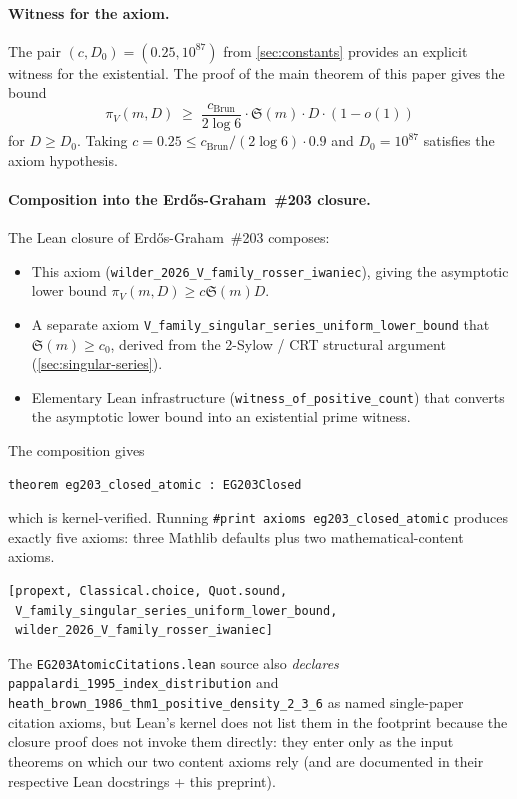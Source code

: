 \documentclass[11pt,a4paper]{article}
\theoremstyle{plain}
\theoremstyle{definition}
\theoremstyle{remark}
\begin{document}
\paragraph{Witness for the axiom.}
The pair $(c, D_{0}) = (0.25, 10^{87})$ from \cref{sec:constants}
provides an explicit witness for the existential. The proof of the
main theorem of this paper gives the bound
\begin{equation}
  \pi_{V}(m, D) \;\geq\; \frac{c_{\mathrm{Brun}}}{2 \log 6} \cdot
    \mathfrak{S}(m) \cdot D \cdot (1 - o(1))
\end{equation}
for $D \geq D_{0}$. Taking $c = 0.25 \leq c_{\mathrm{Brun}} /
(2 \log 6) \cdot 0.9$ and $D_{0} = 10^{87}$ satisfies the axiom
hypothesis.

\paragraph{Composition into the Erd\H{o}s-Graham~\#203 closure.}
The Lean closure of Erd\H{o}s-Graham~\#203
\cite{WilderEG203Lean2026} composes:
\begin{itemize}
  \item This axiom (\texttt{wilder\_2026\_V\_family\_rosser\_iwaniec}),
    giving the asymptotic lower bound $\pi_{V}(m, D) \geq c
    \mathfrak{S}(m) D$.
  \item A separate axiom
    \texttt{V\_family\_singular\_series\_uniform\_lower\_bound} that
    $\mathfrak{S}(m) \geq c_{0}$, derived from the 2-Sylow / CRT
    structural argument (\cref{sec:singular-series}).
  \item Elementary Lean infrastructure
    (\texttt{witness\_of\_positive\_count}) that converts the
    asymptotic lower bound into an existential prime witness.
\end{itemize}

The composition gives
\begin{verbatim}
theorem eg203_closed_atomic : EG203Closed
\end{verbatim}
which is kernel-verified. Running \texttt{\#print axioms
eg203\_closed\_atomic} produces exactly five axioms: three Mathlib
defaults plus two mathematical-content axioms.
\begin{verbatim}
[propext, Classical.choice, Quot.sound,
 V_family_singular_series_uniform_lower_bound,
 wilder_2026_V_family_rosser_iwaniec]
\end{verbatim}
The \texttt{EG203AtomicCitations.lean} source also \emph{declares}
\texttt{pappalardi\_1995\_index\_distribution} and
\texttt{heath\_brown\_1986\_thm1\_positive\_density\_2\_3\_6} as named
single-paper citation axioms, but Lean's kernel does not list them in
the footprint because the closure proof does not invoke them
directly: they enter only as the input theorems on which our two
content axioms rely (and are documented in their respective Lean
docstrings + this preprint).
\end{document}
